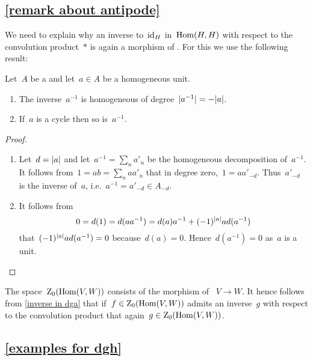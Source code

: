 \documentclass[a4paper,10pt,headings=standardclasses]{scrartcl}
\begin{document}
\subsection{\cref{remark about antipode}}
\label{remark about antipode proof}

We need to explain why an inverse to~$\operatorname{id}_H$ in~$\operatorname{Hom}(H,H)$ with respect to the convolution product~$*$ is again a  morphism of {\dgvs}.
For this we use the following result:

\begin{lemma}
  \label{inverse in dga}
  Let~$A$ be a {\dga} and let~$a \in A$ be a homogeneous unit.
  \begin{enumerate}
    \item
      The inverse~$a^{-1}$ is homogeneous of degree~$\lvert a^{-1}\rvert = - \lvert a\rvert$.
    \item
      If~$a$ is a cycle then so is~$a^{-1}$.
  \end{enumerate}
\end{lemma}

\begin{proof}
  \leavevmode
  \begin{enumerate}
    \item
      Let~$d = \lvert a\rvert$ and let~$a^{-1} = \sum_n a'_n$ be the homogeneous decomposition of~$a^{-1}$.
      It follows from~$1 = ab = \sum_n a a'_n$ that in degree zero,~$1 = a a'_{-d}$.
      Thus~$a'_{-d}$ is the inverse of~$a$, i.e.~$a^{-1} = a'_{-d} \in A_{-d}$.
    \item
      It follows from
      \[
        0
        =
        d(1)
        =
        d(a a^{-1})
        =
        d(a) a^{-1}
        +
        (-1)^{\lvert a\rvert} a d(a^{-1})
      \]
      that~$(-1)^{\lvert a\rvert} a d(a^{-1}) = 0$ because~$d(a) = 0$.
      Hence~$d(a^{-1}) = 0$ as~$a$ is a unit.
    \qedhere
  \end{enumerate}
\end{proof}

The space~$\operatorname{Z}_0(\operatorname{Hom}(V,W))$ consists of the morphism of {\dgvs}~$V \to W$.
It hence follows from \cref{inverse in dga} that if~$f \in \operatorname{Z}_0(\operatorname{Hom}(V,W))$ admits an inverse~$g$ with respect to the convolution product that again~$g \in \operatorname{Z}_0(\operatorname{Hom}(V,W))$.



\subsection{\cref{examples for dgh}}
\label{examples for dgh proof}
\end{document}
